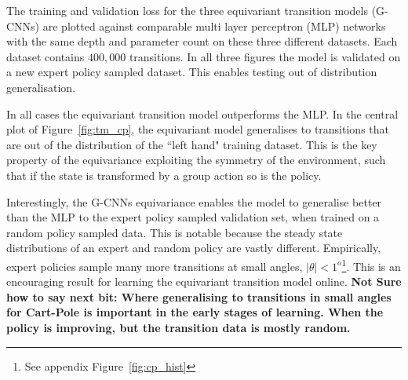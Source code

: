 \documentclass[mlabstract]{jmlr}
\begin{document}
The training and validation loss for the three equivariant transition models (G-CNNs) are plotted against comparable multi layer perceptron (MLP) networks with the same depth and parameter count on these three different datasets. Each dataset contains $400,000$ transitions. In all three figures the model is validated on a new expert policy sampled dataset. This enables testing out of distribution generalisation.

In all cases the equivariant transition model outperforms the MLP. In the central plot of Figure~\ref{fig:tm_cp}, the equivariant model generalises to transitions that are out of the distribution of the ``left hand" training dataset. This is the key property of the equivariance exploiting the symmetry of the environment, such that if the state is transformed by a group action so is the policy.

Interestingly, the G-CNNs equivariance enables the model to generalise better than the MLP to the expert policy sampled validation set, when trained on a random policy sampled data. This is notable because the steady state distributions of an expert and random policy are vastly different. Empirically, expert policies sample many more transitions at small angles, $|\theta| < 1^o$\footnote{See appendix Figure~\ref{fig:cp_hist}}. This is an encouraging result for learning the equivariant transition model online. \textbf{Not Sure how to say next bit: Where generalising to transitions in small angles for Cart-Pole is important in the early stages of learning. When the policy is improving, but the transition data is mostly random.}
\end{document}
